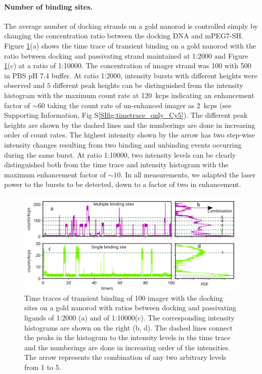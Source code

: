 \paragraph{Number of binding sites.} The average number of docking strands on a gold nanorod is controlled simply by changing the concentration ratio between the docking DNA and mPEG7-SH.
Figure \ref{fig:timetrace1vsmany}(a) shows the time trace of transient binding on a gold nanorod with the ratio between docking and passivating strand maintained at 1:2000 and Figure \ref{fig:timetrace1vsmany}(c) at a ratio of 1:10000.
The concentration of imager strand was \SI{100}{\nM} with \SI{500}{\mM}  in PBS pH 7.4 buffer.
At ratio 1:2000, intensity bursts with different heights were observed and $5$ different peak heights can be distinguished from the intensity histogram with the maximum count rate at \SI{120}{ kcps} indicating an enhancement factor of $\sim60$ taking the count rate of un-enhanced imager as \SI{2} { kcps} (see Supporting Information, Fig S\ref{SIfig:timetrace_only_Cy5}).
The different peak heights are shown by the dashed lines and the numberings are done in increasing order of count rates.
The highest intensity shown by the arrow has two step-wise intensity changes resulting from two binding and unbinding events occurring during the same burst.
At ratio 1:10000, two intensity levels can be clearly distinguished both from the time trace and intensity histogram with the maximum enhancement factor of $\sim10$.
In all measurements, we adapted the laser power to the bursts to be detected, down to a factor of two in enhancement.
\begin{figure}[ht]
	\centering
	\includegraphics[width=\textwidth]{timetrace1vsmany}%
	\caption{Time traces of transient binding of \SI{100}{\nM} imager with the docking sites on a gold nanorod with ratios between docking and passivating ligands of 1:2000 (a) and of 1:10000(c).
	The corresponding intensity histograms are shown on the right (b, d).
	The dashed lines connect the peaks in the histogram to the intensity levels in the time trace and the numberings are done in increasing order of the intensities.
	The arrow represents the combination of any two arbitrary levels from 1 to 5. 
	}
  	\label{fig:timetrace1vsmany}
\end{figure}


